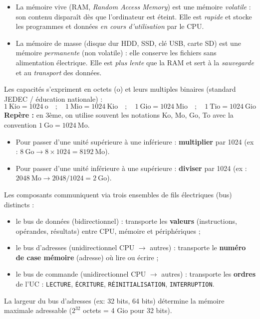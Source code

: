 \documentclass[11pt]{article}
\newcommand{\cle}[1]{{\popxbold\color{popdark}#1}}
\newcounter{popsec}
\newcounter{popsub}
\newcommand{\courssub}[1]{%
  \stepcounter{popsub}%
  \par\vspace{9pt}\noindent{\popxbold\fontsize{11.5}{13}\selectfont\color{popink}{\color{poporange}\thepopsec.\thepopsub}\hspace{6pt}#1}\par\nopagebreak\vspace{4pt}
}
\begin{document}
\courssub{Les mémoires et les bus}

\begin{definition}
\begin{itemize}
\item La \cle{mémoire vive} (RAM, \emph{Random Access Memory}) est une mémoire \emph{volatile} : son contenu disparaît dès que l'ordinateur est éteint. Elle est \emph{rapide} et stocke les programmes et données \emph{en cours d'utilisation} par le CPU.
\item La \cle{mémoire de masse} (disque dur HDD, SSD, clé USB, carte SD) est une mémoire \emph{permanente} (non volatile) : elle conserve les fichiers sans alimentation électrique. Elle est \emph{plus lente} que la RAM et sert à la \emph{sauvegarde} et au \emph{transport} des données.
\end{itemize}
\end{definition}

\begin{propriete}
Les capacités s'expriment en octets (o) et leurs multiples binaires (standard JEDEC / éducation nationale) :
\[ 1\ \text{Kio} = 1024\ \text{o} \quad;\quad 1\ \text{Mio} = 1024\ \text{Kio} \quad;\quad 1\ \text{Gio} = 1024\ \text{Mio} \quad;\quad 1\ \text{Tio} = 1024\ \text{Gio} \]
\textbf{Repère :} en 3ème, on utilise souvent les notations Ko, Mo, Go, To avec la convention $1\ \text{Go} = 1024\ \text{Mo}$.
\begin{itemize}
\item Pour passer d'une unité supérieure à une inférieure : \textbf{multiplier} par 1024 (ex : $8\ \text{Go} \rightarrow 8 \times 1024 = 8192\ \text{Mo}$).
\item Pour passer d'une unité inférieure à une supérieure : \textbf{diviser} par 1024 (ex : $2048\ \text{Mo} \rightarrow 2048 / 1024 = 2\ \text{Go}$).
\end{itemize}
\end{propriete}

\begin{definition}
Les composants communiquent via trois ensembles de fils électriques (bus) distincts :
\begin{itemize}
\item le \cle{bus de données} (bidirectionnel) : transporte les \textbf{valeurs} (instructions, opérandes, résultats) entre CPU, mémoire et périphériques ;
\item le \cle{bus d'adresses} (unidirectionnel CPU $\rightarrow$ autres) : transporte le \textbf{numéro de case mémoire} (adresse) où lire ou écrire ;
\item le \cle{bus de commande} (unidirectionnel CPU $\rightarrow$ autres) : transporte les \textbf{ordres} de l'UC : \texttt{LECTURE}, \texttt{ÉCRITURE}, \texttt{RÉINITIALISATION}, \texttt{INTERRUPTION}.
\end{itemize}
La \cle{largeur du bus d'adresses} (ex: 32 bits, 64 bits) détermine la mémoire maximale adressable ($2^{32}$ octets = 4 Gio pour 32 bits).
\end{definition}
\end{document}
